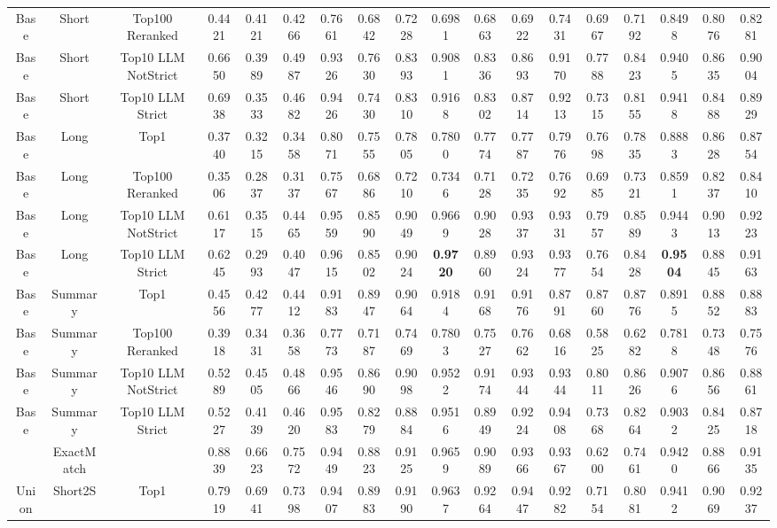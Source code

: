 \documentclass[11pt]{article}
\begin{document}
\begin{table*}[h]
{\begin{tabular}{ccc|ccc|ccc|ccc|ccc|ccc}
Base & Short & Top100 Reranked & 0.4421 & 0.4121 & 0.4266 & 0.7661 & 0.6842 & 0.7228 & 0.6981 & 0.6863 & 0.6922 & 0.7431 & 0.6967 & 0.7192 & 0.8498 & 0.8076 & 0.8281 \\
Base & Short & Top10 LLM NotStrict & 0.6650 & 0.3989 & 0.4987 & 0.9326 & 0.7630 & 0.8393 & 0.9081 & 0.8336 & 0.8693 & 0.9170 & 0.7788 & 0.8423 & 0.9405 & 0.8635 & 0.9004 \\
Base & Short & Top10 LLM Strict & 0.6938 & 0.3533 & 0.4682 & 0.9426 & 0.7430 & 0.8310 & 0.9168 & 0.8302 & 0.8714 & 0.9213 & 0.7315 & 0.8155 & 0.9418 & 0.8488 & 0.8929 \\
Base & Long & Top1 & 0.3740 & 0.3215 & 0.3458 & 0.8071 & 0.7555 & 0.7805 & 0.7800 & 0.7774 & 0.7787 & 0.7976 & 0.7698 & 0.7835 & 0.8883 & 0.8628 & 0.8754 \\
Base & Long & Top100 Reranked & 0.3506 & 0.2837 & 0.3137 & 0.7567 & 0.6886 & 0.7210 & 0.7346 & 0.7128 & 0.7235 & 0.7692 & 0.6985 & 0.7321 & 0.8591 & 0.8237 & 0.8410 \\
Base & Long & Top10 LLM NotStrict & 0.6117 & 0.3515 & 0.4465 & 0.9559 & 0.8590 & 0.9049 & 0.9669 & 0.9028 & 0.9337 & 0.9331 & 0.7957 & 0.8589 & 0.9443 & 0.9013 & 0.9223 \\
Base & Long & Top10 LLM Strict & 0.6245 & 0.2993 & 0.4047 & 0.9615 & 0.8502 & 0.9024 & \textbf{0.9720} & 0.8960 & 0.9324 & 0.9377 & 0.7654 & 0.8428 & \textbf{0.9504} & 0.8845 & 0.9163 \\
Base & Summary & Top1 & 0.4556 & 0.4277 & 0.4412 & 0.9183 & 0.8947 & 0.9064 & 0.9184 & 0.9168 & 0.9176 & 0.8791 & 0.8760 & 0.8776 & 0.8915 & 0.8852 & 0.8883 \\
Base & Summary & Top100 Reranked & 0.3918 & 0.3431 & 0.3658 & 0.7773 & 0.7187 & 0.7469 & 0.7803 & 0.7527 & 0.7662 & 0.6816 & 0.5825 & 0.6282 & 0.7818 & 0.7348 & 0.7576 \\
Base & Summary & Top10 LLM NotStrict & 0.5289 & 0.4505 & 0.4866 & 0.9546 & 0.8690 & 0.9098 & 0.9522 & 0.9174 & 0.9344 & 0.9344 & 0.8011 & 0.8626 & 0.9076 & 0.8656 & 0.8861 \\
Base & Summary & Top10 LLM Strict & 0.5227 & 0.4139 & 0.4620 & 0.9583 & 0.8279 & 0.8884 & 0.9516 & 0.8949 & 0.9224 & 0.9408 & 0.7368 & 0.8264 & 0.9032 & 0.8425 & 0.8718 \\
\hline
& ExactMatch &  & 0.8839 & 0.6623 & 0.7572 & 0.9449 & 0.8823 & 0.9125 & 0.9659 & 0.9089 & 0.9366 & 0.9367 & 0.6200 & 0.7461 & 0.9420 & 0.8866 & 0.9135 \\
\hline
Union & Short2S & Top1 & 0.7919 & 0.6941 & 0.7398 & 0.9407 & 0.8983 & 0.9190 & 0.9637 & 0.9264 & 0.9447 & 0.9282 & 0.7154 & 0.8081 & 0.9412 & 0.9069 & 0.9237 \\

\end{tabular}}
\end{table*}
\end{document}
